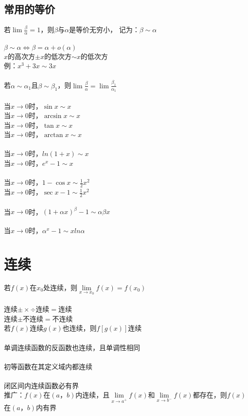 \documentclass{article}
\begin{document}
\begin{flushleft}
	\subsection{常用的等价}
	
	若$\lim \frac{\beta}{\alpha}=1$，则$\beta$与$\alpha$是等价无穷小，
	记为：$\beta \sim \alpha$\\
	~\\
	$\beta \sim \alpha \Leftrightarrow \beta = \alpha + o(\alpha)$\\
	$x$的高次方$\pm x$的低次方$\sim x$的低次方\\
	\qquad 例：$x^3+3x\sim 3x$\\
	~\\
	若$\alpha \sim \alpha_1$且$\beta \sim \beta_1$，则$\lim \frac{\beta}{\alpha} = \lim \frac{\beta_1}{\alpha_1}$\\
	~\\
	当$x\to 0$时，$\sin x \sim x$\\
	当$x\to 0$时，$\arcsin x \sim x$\\
	当$x\to 0$时，$\tan x \sim x$\\
	当$x\to 0$时，$\arctan x \sim x$\\
	~\\
	当$x\to 0$时，$ln(1+x) \sim x$\\
	当$x\to 0$时，$e^x-1 \sim x$\\
	~\\
	当$x\to 0$时，$1-\cos x \sim \frac{1}{2} x^2$\\
	当$x\to 0$时，$\sec x - 1 \sim \frac{1}{2} x^2$\\
	~\\
	当$x\to 0$时，$(1+\alpha x)^\beta -1 \sim \alpha\beta x$\\
	~\\
	当$x\to 0$时，$\alpha^x -1 \sim xln\alpha$\\
	
	\section{连续}
	
	若$f(x)$在$x_0$处连续，则$\lim\limits_{x\to x_0} f(x)=f(x_0)$\\
	~\\
	连续$\pm\times\div$连续$=$连续\\
	连续$\pm$不连续$=$不连续\\
	若$f(x)$连续$g(x)$也连续，则$f[g(x)]$连续\\
	~\\
	单调连续函数的反函数也连续，且单调性相同\\
	~\\
	初等函数在其定义域内都连续\\
	~\\
	闭区间内连续函数必有界\\
	推广：$f(x)$在$(a，b)$内连续，且$\lim\limits_{x\to a^+} f(x)$和$\lim\limits_{x\to b^-} f(x)$都存在，则$f(x)$在$(a，b)$内有界\\
	

\end{flushleft}
\end{document}
